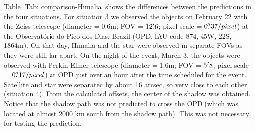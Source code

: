 Table \ref{Tab: comparison-Himalia} shows the differences between the predictions in the four situations. For situation 3 we observed the objects on February 22 with the Zeiss telescope (diameter = 0.6m; FOV = $12\hbox{$.\mkern-4mu^\prime$}6$; pixel scale = $0\hbox{$.\!\!^{\prime\prime}$}37 / pixel$) at the Observatório do Pico dos Dias, Brazil (OPD, IAU code 874, 45\arcsec W, 22\arcsec S, 1864m). On that day, Himalia and the star were observed in separate FOVs as they were still far apart. On the night of the event, March 3, the objects were observed with Perkin-Elmer telescope (diameter = 1.6m; FOV = $5\hbox{$.\mkern-4mu^\prime$}8$; pixel scale = $0\hbox{$.\!\!^{\prime\prime}$}17 / pixel$) at OPD just over an hour after the time scheduled for the event. Satellite and star were separated by about 16 arcsec, so very close to each other (situation 4). From the calculated offsets, the center of the shadow was obtained. Notice that the shadow path was not predicted to cross the OPD (which was located at almost 2000 km south from the shadow path). This was not necessary for testing the prediction.


